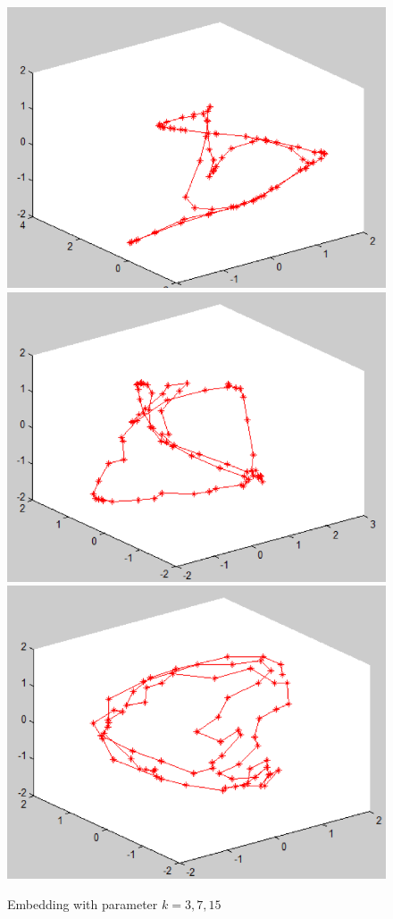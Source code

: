 \documentclass[12pt]{article} %
\begin{document}
	\begin{figure}[ht]\centering
		\includegraphics[scale=0.2]{Figure_5}
		\includegraphics[scale=0.2]{Figure_6}
		\includegraphics[scale=0.2]{Figure_7}
		\caption{Embedding with parameter $k = 3,7,15$}
	\end{figure}
\end{document}
